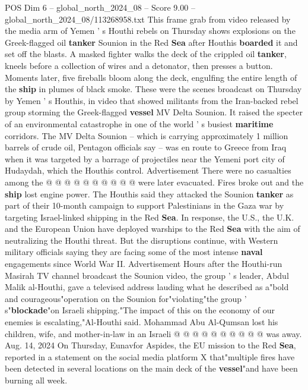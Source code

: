 \begin{textsample}{POS Dim 6 – global\_north\_2024\_08 – Score 9.00 – global\_north\_2024\_08/113268958.txt}  \label{ex:f6_pos_292}
This frame grab from video released by the media arm of Yemen ' s Houthi rebels on Thursday shows explosions on the Greek-flagged oil \textbf{tanker} Sounion in the Red \textbf{Sea} after Houthis \textbf{boarded} it and set off the blasts.
A masked fighter walks the deck of the crippled oil \textbf{tanker}, kneels before a collection of wires and a detonator, then presses a button.
Moments later, five fireballs bloom along the deck, engulfing the entire length of the \textbf{ship} in plumes of black smoke.
These were the scenes broadcast on Thursday by Yemen ' s Houthis, in video that showed militants from the Iran-backed rebel group storming the Greek-flagged \textbf{vessel} MV Delta Sounion.
It raised the specter of an environmental catastrophe in one of the world ' s busiest \textbf{maritime} corridors.
The MV Delta Sounion -- which is carrying approximately 1 million barrels of crude oil, Pentagon officials say -- was en route to Greece from Iraq when it was targeted by a barrage of projectiles near the Yemeni port city of Hudaydah, which the Houthis control.
Advertisement There were no casualties among the @ @ @ @ @ @ @ @ @ @ were later evacuated.
Fires broke out and the \textbf{ship} lost engine power.
The Houthis said they attacked the Sounion \textbf{tanker} as part of their 10-month campaign to support Palestinians in the Gaza war by targeting Israel-linked shipping in the Red \textbf{Sea}.
In response, the U.S., the U.K. and the European Union have deployed warships to the Red \textbf{Sea} with the aim of neutralizing the Houthi threat.
But the disruptions continue, with Western military officials saying they are facing some of the most intense \textbf{naval} engagements since World War II.
Advertisement Hours after the Houthi-run Masirah TV channel broadcast the Sounion video, the group ' s leader, Abdul Malik al-Houthi, gave a televised address lauding what he described as a"bold and courageous"operation on the Sounion for"violating"the group ' s"\textbf{blockade}"on Israeli shipping."The impact of this on the economy of our enemies is escalating,"Al-Houthi said.
Mohammad Abu Al-Qumsan lost his children, wife, and mother-in-law in an Israeli @ @ @ @ @ @ @ @ @ @ was away.
Aug. 14, 2024 On Thursday, Eunavfor Aspides, the EU mission to the Red \textbf{Sea}, reported in a statement on the social media platform X that"multiple fires have been detected in several locations on the main deck of the \textbf{vessel}"and have been burning all week.

\end{textsample}
